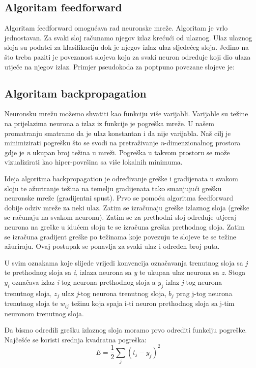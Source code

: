 \documentclass[times, utf8, zavrsni]{fer}
\begin{document}
\subsection{Algoritam feedforward}
Algoritam feedforward omogućava rad neuronske mreže. Algoritam je vrlo jednostavan. Za svaki sloj računamo njegov izlaz krećući od ulaznog. Ulaz ulaznog sloja su podatci za klasifikaciju dok je njegov izlaz ulaz sljedećeg sloja. Jedino na što treba paziti je povezanost slojeva koja za svaki neuron određuje koji dio ulaza utječe na njegov izlaz. Primjer pseudokoda za poptpuno povezane slojeve je:

\subsection{Algoritam backpropagation}
Neuronsku mrežu možemo shvatiti kao funkciju više varijabli. Varijable su težine na prijelazima neurona a izlaz iz funkcije je pogreška mreže. U našem promatranju smatramo da je ulaz konstantan i da nije varijabla. Naš cilj je minimizirati pogrešku što se svodi na pretraživanje \textit{n}-dimenzionalnog prostora gdje je \textit{n} ukupan broj težina u mreži. Pogreška u takvom prostoru se može vizualizirati kao hiper-površina sa više lokalnih minimuma.

Ideja algoritma backpropagation je određivanje greške i gradijenata u svakom sloju te ažuriranje težina na temelju gradijenata tako smanjujući grešku neuronske mreže (gradijentni spust). Prvo se pomoću algoritma feedforward dobije odziv mreže za neki ulaz. Zatim se izračunaju greške izlaznog sloja (greške se računaju na svakom neuronu). Zatim se za prethodni sloj određuje utjecaj neurona na greške u idućem sloju te se izračuna greška prethodnog sloja. Zatim se izračuna gradijent greške po težinama koje povezuju te slojeve te se težine ažuriraju. Ovaj postupak se ponavlja za svaki ulaz i određen broj puta.

U svim oznakama koje slijede vrijedi konvencija označavanja trenutnog sloja sa \textit{j} te prethodnog sloja sa \textit{i}, izlaza neurona sa \textit{y} te ukupan ulaz neurona sa \textit{z}. Stoga $y_{i}$ označava izlaz \textit{i}-tog neurona prethodnog sloja a $y_{j}$ izlaz \textit{j}-tog neurona trenutnog sloja, $z_{j}$ ulaz \textit{j}-tog neurona trenutnog sloja, $b_j$ prag j-tog neurona trenutnog sloja te $w_{ij}$ težinu koja spaja i-ti neuron prethodnog sloja sa j-tim neuronom trenutnog sloja.

Da bismo odredili grešku izlaznog sloja moramo prvo odrediti funkciju pogreške. Najčešće se koristi srednja kvadratna pogreška:
\begin{equation}\label{eq:sr-kv-pogr}
  E = \frac{1}{2}\sum_j(t_j-y_j)^2
\end{equation}
\end{document}
